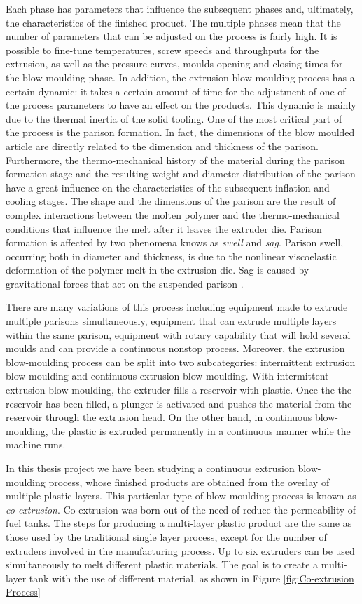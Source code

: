 Each phase has parameters that inﬂuence the subsequent phases and, ultimately, the characteristics of the ﬁnished product. The multiple phases mean that the number of parameters that can be adjusted on the process is fairly high. It is possible to fine-tune temperatures, screw speeds and throughputs for the extrusion, as well as the  pressure curves, moulds opening and closing times for the blow-moulding phase. In addition, the extrusion blow-moulding process has a certain dynamic: it takes a certain amount of time for the adjustment of one of the process parameters to have an effect on the products. This dynamic is mainly due to the thermal inertia of the solid tooling.
One of the most critical part of the process is the parison formation. In fact, the dimensions of the blow moulded article are directly related to the dimension and thickness of the parison. Furthermore, the thermo-mechanical history of the material during the parison formation stage and the resulting weight and diameter distribution of the parison have a great influence on the characteristics of the subsequent inflation and cooling stages. The shape and the dimensions of the parison are the result of complex interactions between the molten polymer and the thermo-mechanical conditions that influence the melt after it leaves the extruder die. Parison formation is affected by two phenomena knows as \textit{swell} and \textit{sag}. Parison swell, occurring both in diameter and thickness, is due to the nonlinear viscoelastic deformation of the polymer melt in the extrusion die. Sag is caused by gravitational forces that act on the suspended parison \citep{huang2002prediction}.

There are many variations of this process including equipment made to extrude multiple parisons simultaneously, equipment that can extrude multiple layers within the same parison, equipment with rotary capability that will hold several moulds and can provide a continuous nonstop process. Moreover, the extrusion blow-moulding process can be split into two subcategories: intermittent extrusion blow moulding and continuous extrusion blow moulding. With intermittent extrusion blow moulding, the extruder fills a reservoir with plastic. Once the the reservoir has been filled, a plunger is activated and pushes the material from the reservoir through the extrusion head. On the other hand, in continuous blow-moulding, the plastic is extruded permanently in a continuous manner while the machine runs.

In this thesis project we have been studying a continuous extrusion blow-moulding process, whose finished products are obtained from the overlay of multiple plastic layers. This particular type of blow-moulding process is known as \textit{co-extrusion}. Co-extrusion was born out of the need of reduce the permeability of fuel tanks. The steps for producing a multi-layer plastic product are the same as those used by the traditional single layer process, except for the number of extruders involved in the manufacturing process. Up to six extruders can be used simultaneously to melt different plastic materials. The goal is to create a multi-layer tank with the use of different material, as shown in
Figure \ref{fig:Co-extrusion Process}

